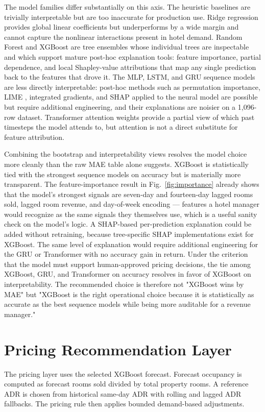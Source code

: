 \documentclass[conference]{IEEEtran}
\begin{document}
The model families differ substantially on this axis. The heuristic baselines are trivially interpretable but are too inaccurate for production use. Ridge regression provides global linear coefficients but underperforms by a wide margin and cannot capture the nonlinear interactions present in hotel demand. Random Forest and XGBoost are tree ensembles whose individual trees are inspectable and which support mature post-hoc explanation tools: feature importance, partial dependence, and local Shapley-value attributions \cite{lundberg2017shap} that map any single prediction back to the features that drove it. The MLP, LSTM, and GRU sequence models are less directly interpretable: post-hoc methods such as permutation importance, LIME \cite{ribeiro2016lime}, integrated gradients, and SHAP applied to the neural model are possible but require additional engineering, and their explanations are noisier on a 1,096-row dataset. Transformer attention weights provide a partial view of which past timesteps the model attends to, but attention is not a direct substitute for feature attribution.

Combining the bootstrap and interpretability views resolves the model choice more cleanly than the raw MAE table alone suggests. XGBoost is statistically tied with the strongest sequence models on accuracy but is materially more transparent. The feature-importance result in Fig.~\ref{fig:importance} already shows that the model's strongest signals are seven-day and fourteen-day lagged rooms sold, lagged room revenue, and day-of-week encoding --- features a hotel manager would recognize as the same signals they themselves use, which is a useful sanity check on the model's logic. A SHAP-based per-prediction explanation could be added without retraining, because tree-specific SHAP implementations exist for XGBoost. The same level of explanation would require additional engineering for the GRU or Transformer with no accuracy gain in return. Under the criterion that the model must support human-approved pricing decisions, the tie among XGBoost, GRU, and Transformer on accuracy resolves in favor of XGBoost on interpretability. The recommended choice is therefore not "XGBoost wins by MAE" but "XGBoost is the right operational choice because it is statistically as accurate as the best sequence models while being more auditable for a revenue manager."

\section{Pricing Recommendation Layer}
The pricing layer uses the selected XGBoost forecast. Forecast occupancy is computed as forecast rooms sold divided by total property rooms. A reference ADR is chosen from historical same-day ADR with rolling and lagged ADR fallbacks. The pricing rule then applies bounded demand-based adjustments.
\end{document}
